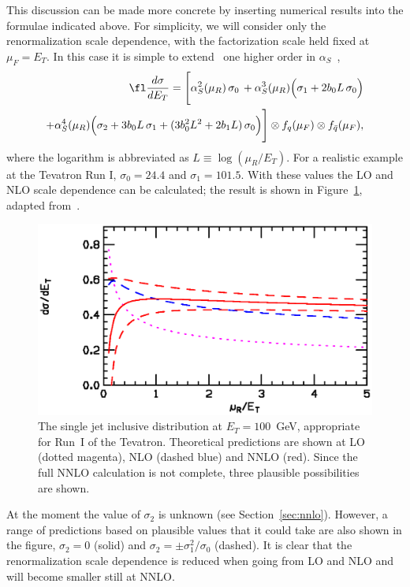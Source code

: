 \documentclass[12pt]{iopart}
\def\as{\alpha_S}
\begin{document}
This discussion can be made more concrete by inserting numerical results into the
formulae indicated above. For simplicity, we will consider only the renormalization
scale dependence, with the factorization scale held fixed at $\mu_F=E_T$.
In this case it is simple to extend~ one higher order in
$\as$~\cite{Glover:2002gz}, 
\begin{eqnarray}
\fl
\frac{d\sigma}{dE_T} = \Biggl[ \as^2(\mu_R) \, \sigma_0 \,
 + \as^3(\mu_R) \Bigl(
   \sigma_1 + 2b_0 L\, \sigma_0
   \Bigr) 
   \nonumber \\
 + \as^4(\mu_R) \Bigl(
   \sigma_2 + 3b_0 L \, \sigma_1 + (3b_0^2 L^2 + 2b_1L) \, \sigma_0 
   \Bigr)
   \Biggr] \otimes f_q(\mu_F) \otimes f_{\bar q}(\mu_F),
\end{eqnarray}
where the logarithm is abbreviated as $L \equiv \log(\mu_R/E_T)$. For a realistic
example at the Tevatron Run I, $\sigma_0=24.4$ and $\sigma_1=101.5$. With these values
the LO and NLO scale dependence can be calculated; the result is shown
in Figure~\ref{fig:mudepplot}, adapted from~\cite{Glover:2002gz}.
%
\begin{figure}[t]
\begin{center}
\includegraphics[width=12cm]{mudepplot.ps}
\end{center}
\caption{The single jet inclusive distribution at $E_T=100$~GeV, appropriate
for Run~I of the Tevatron. Theoretical predictions are shown at LO (dotted
magenta), NLO (dashed blue) and NNLO (red). Since the full NNLO calculation is
not complete, three plausible possibilities are shown.\label{fig:mudepplot}}
\end{figure}
%
At the moment the value of $\sigma_2$ is unknown (see Section~\ref{sec:nnlo}). However,
a range of predictions based on plausible values that it could take are also shown
in the figure, $\sigma_2=0$ (solid) and $\sigma_2 = \pm \sigma_1^2/\sigma_0$ (dashed).
It is clear that the renormalization scale dependence is reduced
when going from LO and NLO and will become smaller still at NNLO.
\end{document}

